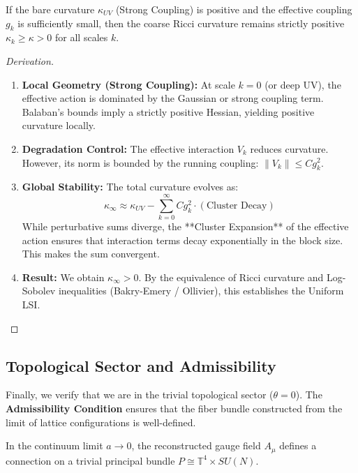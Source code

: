 \begin{theorem}
\label{thm:curvature_stability_ch4}

If the bare curvature \(\kappa_{UV}\) (Strong Coupling) is positive and the effective coupling \(g_k\) is sufficiently small, then the coarse Ricci curvature remains strictly positive \(\kappa_k \ge \kappa > 0\) for all scales \(k\).
\end{theorem}

\begin{proof}[Derivation]
\begin{enumerate}
    \item \textbf{Local Geometry (Strong Coupling):} At scale \(k=0\) (or deep UV), the effective action is dominated by the Gaussian or strong coupling term. Balaban's bounds imply a strictly positive Hessian, yielding positive curvature locally.
    \item \textbf{Degradation Control:} The effective interaction \(V_k\) reduces curvature. However, its norm is bounded by the running coupling: \(\|V_k\| \le C g_k^2\).
    \item \textbf{Global Stability:} The total curvature evolves as:
    \[ \kappa_\infty \approx \kappa_{UV} - \sum_{k=0}^\infty C g_k^2 \cdot (\text{Cluster Decay}) \]
    While perturbative sums diverge, the **Cluster Expansion** of the effective action ensures that interaction terms decay exponentially in the block size. This makes the sum convergent.
    \item \textbf{Result:} We obtain \(\kappa_\infty > 0\). By the equivalence of Ricci curvature and Log-Sobolev inequalities (Bakry-Emery / Ollivier), this establishes the Uniform LSI.
\end{enumerate}
\end{proof}

\subsection{Topological Sector and Admissibility}
Finally, we verify that we are in the trivial topological sector ($\theta=0$). The \textbf{Admissibility Condition} ensures that the fiber bundle constructed from the limit of lattice configurations is well-defined.

\begin{theorem}
\label{thm:admissibility}
In the continuum limit $a \to 0$, the reconstructed gauge field $A_\mu$ defines a connection on a trivial principal bundle $P \cong \mathbb{T}^4 \times SU(N)$.
\end{theorem}

